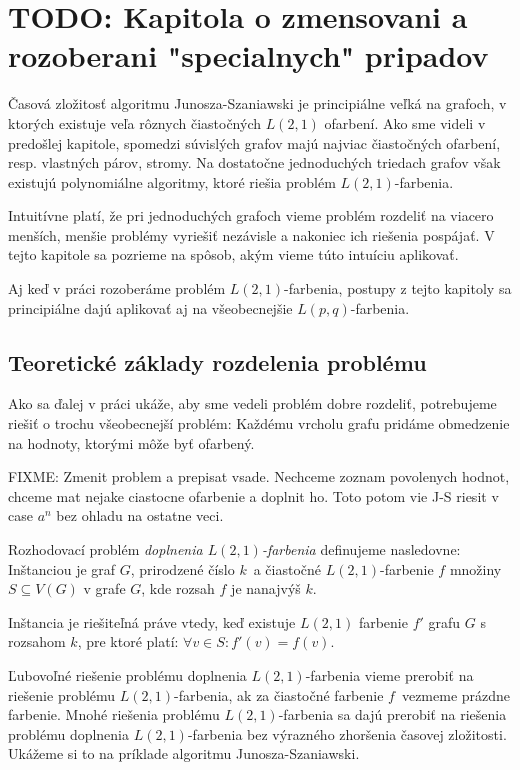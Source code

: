 \chapter{TODO: Kapitola o zmensovani a rozoberani "specialnych" pripadov}

Časová zložitosť algoritmu Junosza-Szaniawski je principiálne veľká na grafoch, v ktorých
existuje veľa rôznych čiastočných $L(2,1)$ ofarbení. Ako sme videli v predošlej kapitole,
spomedzi súvislých grafov majú najviac čiastočných ofarbení, resp. vlastných párov, stromy.
Na dostatočne jednoduchých triedach grafov však existujú polynomiálne algoritmy, ktoré
riešia problém $L(2,1)$-farbenia.

Intuitívne platí, že pri jednoduchých grafoch vieme problém rozdeliť na viacero menších,
menšie problémy vyriešiť nezávisle a nakoniec ich riešenia pospájať. V tejto kapitole
sa pozrieme na spôsob, akým vieme túto intuíciu aplikovať.

Aj keď v práci rozoberáme problém $L(2,1)$-farbenia, postupy z tejto kapitoly sa principiálne
dajú aplikovať aj na všeobecnejšie $L(p,q)$-farbenia.

\section{Teoretické základy rozdelenia problému}

Ako sa ďalej v práci ukáže, aby sme vedeli problém dobre rozdeliť, potrebujeme riešiť
o trochu všeobecnejší problém: Každému vrcholu grafu pridáme obmedzenie na hodnoty,
ktorými môže byť ofarbený.

FIXME: Zmenit problem a prepisat vsade. Nechceme zoznam povolenych hodnot, chceme mat nejake
ciastocne ofarbenie a doplnit ho. Toto potom vie J-S riesit v case $a^n$ bez ohladu na ostatne
veci.

\begin{defn}
    Rozhodovací problém \emph{doplnenia $L(2,1)$-farbenia} definujeme nasledovne: Inštanciou je
    graf $G$, prirodzené číslo $k$ a čiastočné $L(2,1)$-farbenie $f$ množiny $S \subseteq V(G)$
    v grafe $G$, kde rozsah $f$ je nanajvýš $k$.

    Inštancia je riešiteľná práve vtedy, keď existuje $L(2,1)$ farbenie
    $f'$ grafu $G$ s rozsahom $k$, pre ktoré platí: $\forall v \in S: f'(v) = f(v)$.
\end{defn}

Ľubovoľné riešenie problému doplnenia $L(2,1)$-farbenia vieme prerobiť na riešenie
problému $L(2,1)$-farbenia, ak za čiastočné farbenie $f$ vezmeme prázdne farbenie.
Mnohé riešenia problému $L(2,1)$-farbenia sa dajú prerobiť na riešenia problému
doplnenia $L(2,1)$-farbenia bez výrazného zhoršenia časovej zložitosti.
Ukážeme si to na príklade algoritmu Junosza-Szaniawski.

